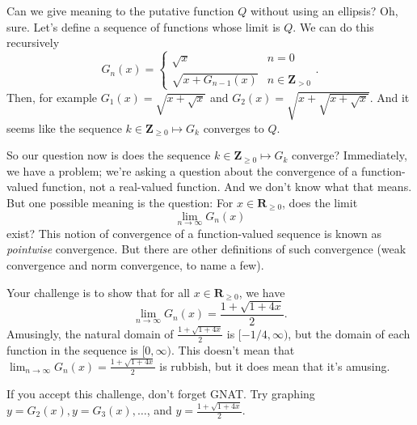 \documentclass[12pt,fleqn,answers]{exam}
\newcommand{\reals}{\mathbf{R}}
\newcommand{\integers}{\mathbf{Z}}
\begin{document}
\begin{questions}
\quad Can we give meaning to the putative function $Q$ without using an ellipsis?  Oh, sure.  Let's define a sequence of functions whose limit
is $Q$.  We can do this recursively
\begin{equation*}
   G_{n}(x) = \begin{cases}  \sqrt{x}  & n = 0 \\ \sqrt{x + G_{n-1}(x)}  & n \in \integers_{> 0} \end{cases}.
\end{equation*}
Then, for example $G_1(x) = \sqrt{x+\sqrt{x}}$ and $G_2(x) = \sqrt{x+\sqrt{x + \sqrt{x}}}$.   And it seems like
the sequence $k \in \integers_{\geq 0} \mapsto G_k$ converges to $Q$.

\quad So our question now is does the sequence $k \in \integers_{\geq 0} \mapsto G_k$ converge?  Immediately, we have a problem; we're asking a 
question about the convergence of a function-valued function, not a real-valued function.  And we don't know what that means.  But one 
possible meaning is the question:  For $x \in \reals_{\geq 0}$, does the limit
\begin{equation*}
      \lim_{n \to \infty} G_n(x) 
\end{equation*}
exist?  This notion of convergence of a function-valued sequence is known as \emph{pointwise} convergence.  But there are other definitions
of such convergence (weak convergence and norm convergence, to name a few).

\quad Your challenge is to show that for all $x \in \reals_{\geq 0}$, we have 
\begin{equation*}
      \lim_{n \to \infty} G_n(x)  = \frac{1 + \sqrt{1 + 4 x}}{2}.
\end{equation*}
Amusingly, the natural domain of $\frac{1 + \sqrt{1 + 4 x}}{2}$ is $[-1/4, \infty)$, but the domain of each function in the sequence is $[0,\infty)$.
This doesn't mean that $\displaystyle \lim_{n \to \infty} G_n(x)  = \frac{1 + \sqrt{1 + 4 x}}{2}$   is rubbish, but it does mean that it's amusing. 

\quad If you accept this challenge, don't forget GNAT.  Try graphing $y = G_2(x), y = G_3(x), \dots$, and $y = \frac{1 + \sqrt{1 + 4 x}}{2}$.


  


\end{questions}
\end{document}
